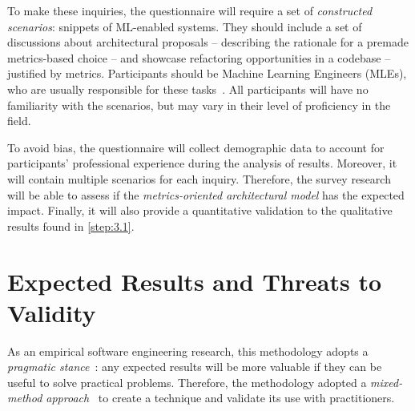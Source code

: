   To make these inquiries, the questionnaire will require a set of
  \emph{constructed scenarios}: snippets of ML-enabled systems.
  They should include a set of discussions about architectural proposals
  -- describing the rationale for a premade metrics-based choice --
  and showcase refactoring opportunities in a codebase -- justified by metrics.
  Participants should be Machine Learning Engineers (MLEs), who are
  usually responsible for these tasks~\parencite{Burkov2020MachineEngineering,
  Wilson2022MachineAction}. All participants will have no familiarity with
  the scenarios, but may vary in their level of proficiency in the field.

  To avoid bias, the questionnaire will collect demographic data to account
  for participants' professional experience during the analysis of results.
  Moreover, it will contain multiple scenarios for each inquiry.
  Therefore, the survey research will be able to assess if the
  \emph{metrics-oriented architectural model} has the expected impact.
  Finally, it will also provide a quantitative validation to the qualitative
  results found in \cref{step:3.1}.


  \section{Expected Results and Threats to Validity}
  \label{sec:methodology_results_threats}


  As an empirical software engineering research, this methodology adopts
  a \emph{pragmatic stance}~\parencite{Easterbrook2008SelectingEngineering}:
  any expected results will be more valuable if they can be useful to solve
  practical problems. Therefore, the methodology adopted a \emph{mixed-method
  approach}~\parencite{Easterbrook2008SelectingEngineering} to create a
  technique and validate its use with practitioners.
  

